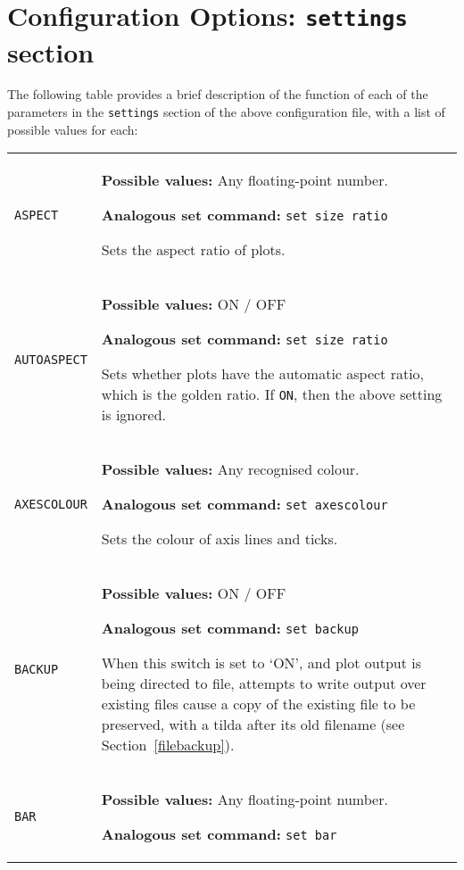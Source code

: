 \documentclass[a4paper,onecolumn,11pt]{book}
\begin{document}
\section{Configuration Options: \texttt{settings} section}
\label{configfile_settings}

The following table provides a brief description of the function of each of the
parameters in the \texttt{settings} section of the above configuration file,
with a list of possible values for each:

\begin{longtable}{p{3.4cm}p{9cm}}
\texttt{ASPECT} & \textbf{Possible values:} Any floating-point number.

                   \textbf{Analogous set command:} \texttt{set size ratio}\index{set size ratio command@\texttt{set size ratio} command}

                   Sets the aspect ratio of plots.
                   \\
\texttt{AUTOASPECT} & \textbf{Possible values:} ON / OFF

                   \textbf{Analogous set command:} \texttt{set size ratio}

                   Sets whether plots have the automatic aspect ratio, which is the golden ratio. If \texttt{ON}, then the above setting is ignored.
                   \\
\texttt{AXESCOLOUR} & \textbf{Possible values:} Any recognised colour.

                   \textbf{Analogous set command:} \texttt{set axescolour}\index{set axescolour command@\texttt{set axescolour} command}

                   Sets the colour of axis lines and ticks.
                   \\
\texttt{BACKUP} & \textbf{Possible values:} ON / OFF

                   \textbf{Analogous set command:} \texttt{set backup}\index{set backup command@\texttt{set backup} command}

                   When this switch is set to `ON', and plot output is being directed to file, attempts to write output over existing files cause a copy of the existing file to be preserved, with a tilda after its old filename (see Section~\ref{filebackup}).
                   \\
\texttt{BAR}     & \textbf{Possible values:}  Any floating-point number.

                   \textbf{Analogous set command:} \texttt{set bar}\index{set bar command@\texttt{set bar} command}


\end{longtable}
\end{document}
